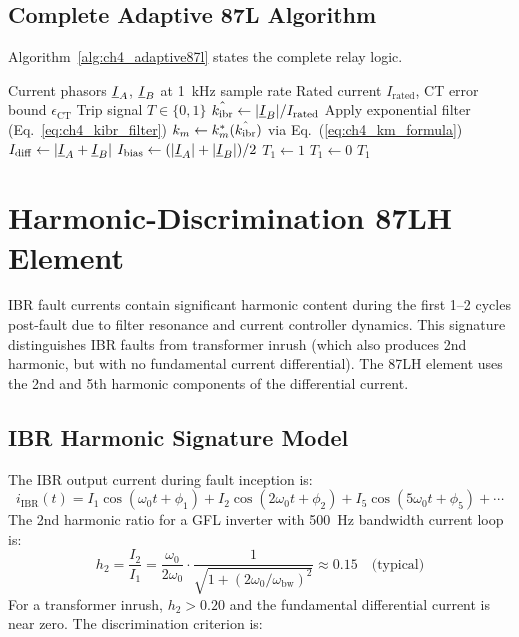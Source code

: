 \subsection{Complete Adaptive 87L Algorithm}

Algorithm~\ref{alg:ch4_adaptive87l} states the complete relay logic.

\begin{algorithm}[htbp]
\caption{Adaptive 87L Threshold (C1)}
\label{alg:ch4_adaptive87l}
\begin{algorithmic}[1]
\Require Current phasors $\underline{I}_A$, $\underline{I}_B$ at 1~kHz sample rate
\Require Rated current $I_\mathrm{rated}$, CT error bound $\epsilon_\mathrm{CT}$
\Ensure Trip signal $T \in \{0, 1\}$
\State $\hat{k_{\mathrm{ibr}}} \leftarrow |\underline{I}_B| / I_\mathrm{rated}$ 
\State Apply exponential filter (Eq.~\ref{eq:ch4_kibr_filter})
\State $k_m \leftarrow k_m^\ast(\hat{k_{\mathrm{ibr}}})$ via Eq.~(\ref{eq:ch4_km_formula})
\State $I_\mathrm{diff} \leftarrow |\underline{I}_A + \underline{I}_B|$
\State $I_\mathrm{bias} \leftarrow (|\underline{I}_A| + |\underline{I}_B|)/2$
  \State $T_1 \leftarrow 1$ 
\Else
  \State $T_1 \leftarrow 0$
\EndIf
\State \Return $T_1$
\end{algorithmic}
\end{algorithm}

\section{Harmonic-Discrimination 87LH Element}
\label{sec:ch4_harmonic}

IBR fault currents contain significant harmonic content during the first
1--2 cycles post-fault due to filter resonance and current controller
dynamics. This signature distinguishes IBR faults from transformer inrush
(which also produces 2nd harmonic, but with no fundamental current
differential). The 87LH element uses the 2nd and 5th harmonic components
of the differential current.

\subsection{IBR Harmonic Signature Model}

The IBR output current during fault inception is:
\begin{equation}
  i_\mathrm{IBR}(t) = I_1\cos(\omega_0 t + \phi_1)
    + I_2\cos(2\omega_0 t + \phi_2)
    + I_5\cos(5\omega_0 t + \phi_5) + \cdots
  \label{eq:ch4_ibr_harmonic}
\end{equation}
The 2nd harmonic ratio for a GFL inverter with 500~Hz bandwidth current
loop is:
\begin{equation}
  h_2 = \frac{I_2}{I_1} = \frac{\omega_0}{2\omega_0}
    \cdot \frac{1}{\sqrt{1 + (2\omega_0/\omega_\mathrm{bw})^2}}
  \approx 0.15 \quad \text{(typical)}
  \label{eq:ch4_h2_ratio}
\end{equation}
For a transformer inrush, $h_2 > 0.20$ and the fundamental differential
current is near zero. The discrimination criterion is:

